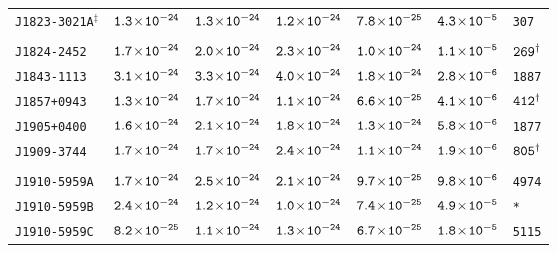 \begin{longtable}{l | c | c | c | c | c | l}
\scriptsize{\tt{J1823-3021A}$^{\ddagger}$} & \scriptsize{$\tt{1.3\!\times\!10^{-24}}$} &
\scriptsize{$\tt{1.3\!\times\!10^{-24}}$} & \scriptsize{$\tt{1.2\!\times\!10^{-24}}$} &\scriptsize{$\tt{7.8\!\times\!10^{-25}}$} &
\scriptsize{$\tt{4.3\!\times\!10^{-5}}$} & \scriptsize{\tt{307}} \\[-16pt] 
\\[-20pt] 
\scriptsize{\tt{J1824-2452}} & \scriptsize{$\tt{1.7\!\times\!10^{-24}}$} & \scriptsize{$\tt{2.0\!\times\!10^{-24}}$} & \scriptsize{$\tt{2.3\!\times\!10^{-24}}$} & \scriptsize{$\tt{1.0\!\times\!10^{-24}}$} & \scriptsize{$\tt{1.1\!\times\!10^{-5}}$} & \scriptsize{$\tt{269^{\dagger}}$} \\[-16pt] 
\scriptsize{\tt{J1843-1113}} & \scriptsize{$\tt{3.1\!\times\!10^{-24}}$} & \scriptsize{$\tt{3.3\!\times\!10^{-24}}$} & \scriptsize{$\tt{4.0\!\times\!10^{-24}}$} &\scriptsize{$\tt{1.8\!\times\!10^{-24}}$} & \scriptsize{$\tt{2.8\!\times\!10^{-6}}$} & \scriptsize{\tt{1887}} \\[-16pt] 
\scriptsize{\tt{J1857+0943}} & \scriptsize{$\tt{1.3\!\times\!10^{-24}}$} & \scriptsize{$\tt{1.7\!\times\!10^{-24}}$} & \scriptsize{$\tt{1.1\!\times\!10^{-24}}$} & \scriptsize{$\tt{6.6\!\times\!10^{-25}}$} & \scriptsize{$\tt{4.1\!\times\!10^{-6}}$} & \scriptsize{$\tt{412^{\dagger}}$} \\[-16pt] 
\scriptsize{\tt{J1905+0400}} & \scriptsize{$\tt{1.6\!\times\!10^{-24}}$} & \scriptsize{$\tt{2.1\!\times\!10^{-24}}$} & \scriptsize{$\tt{1.8\!\times\!10^{-24}}$} &\scriptsize{$\tt{1.3\!\times\!10^{-24}}$} & \scriptsize{$\tt{5.8\!\times\!10^{-6}}$} & \scriptsize{\tt{1877}} \\[-16pt] 
\scriptsize{\tt{J1909-3744}} & \scriptsize{$\tt{1.7\!\times\!10^{-24}}$} & \scriptsize{$\tt{1.7\!\times\!10^{-24}}$} & \scriptsize{$\tt{2.4\!\times\!10^{-24}}$} & \scriptsize{$\tt{1.1\!\times\!10^{-24}}$} & \scriptsize{$\tt{1.9\!\times\!10^{-6}}$} & \scriptsize{$\tt{805^{\dagger}}$} \\[-16pt] 
\\[-20pt] 
\scriptsize{\tt{J1910-5959A}} & \scriptsize{$\tt{1.7\!\times\!10^{-24}}$} & \scriptsize{$\tt{2.5\!\times\!10^{-24}}$} & \scriptsize{$\tt{2.1\!\times\!10^{-24}}$} &\scriptsize{$\tt{9.7\!\times\!10^{-25}}$} & \scriptsize{$\tt{9.8\!\times\!10^{-6}}$} & \scriptsize{\tt{4974}} \\[-16pt] 
\scriptsize{\tt{J1910-5959B}} & \scriptsize{$\tt{2.4\!\times\!10^{-24}}$} & \scriptsize{$\tt{1.2\!\times\!10^{-24}}$} & \scriptsize{$\tt{1.0\!\times\!10^{-24}}$} & \scriptsize{$\tt{7.4\!\times\!10^{-25}}$} & \scriptsize{$\tt{4.9\!\times\!10^{-5}}$} & \scriptsize{\tt{*}} \\[-16pt] 
\scriptsize{\tt{J1910-5959C}} & \scriptsize{$\tt{8.2\!\times\!10^{-25}}$} & \scriptsize{$\tt{1.1\!\times\!10^{-24}}$} & \scriptsize{$\tt{1.3\!\times\!10^{-24}}$} &\scriptsize{$\tt{6.7\!\times\!10^{-25}}$} & \scriptsize{$\tt{1.8\!\times\!10^{-5}}$} & \scriptsize{\tt{5115}} \\[-16pt] 

\end{longtable}
